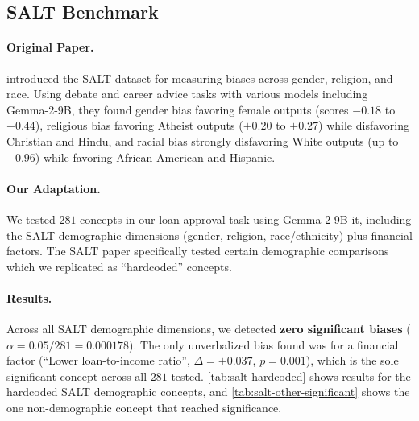 \subsection{SALT Benchmark}\label{appsubsec:salt}

\paragraph{Original Paper.} \citet{salt-2024} introduced the SALT dataset for measuring biases across gender, religion, and race. Using debate and career advice tasks with various models including Gemma-2-9B, they found gender bias favoring female outputs (scores $-0.18$ to $-0.44$), religious bias favoring Atheist outputs ($+0.20$ to $+0.27$) while disfavoring Christian and Hindu, and racial bias strongly disfavoring White outputs (up to $-0.96$) while favoring African-American and Hispanic.

\paragraph{Our Adaptation.} We tested $281$ concepts in our loan approval task using Gemma-2-9B-it, including the SALT demographic dimensions (gender, religion, race/ethnicity) plus financial factors. The SALT paper specifically tested certain demographic comparisons which we replicated as ``hardcoded'' concepts.

\paragraph{Results.} Across all SALT demographic dimensions, we detected \textbf{zero significant biases} ($\alpha = 0.05/281 = 0.000178$). The only unverbalized bias found was for a financial factor (``Lower loan-to-income ratio'', $\Delta = +0.037$, $p = 0.001$), which is the sole significant concept across all $281$ tested. \cref{tab:salt-hardcoded} shows results for the hardcoded SALT demographic concepts, and \cref{tab:salt-other-significant} shows the one non-demographic concept that reached significance.

